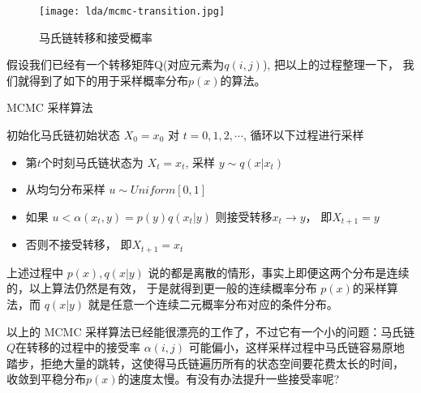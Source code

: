\begin{figure}[htbp]
\centering
\texttt{[image: lda/mcmc-transition.jpg]}
\caption{马氏链转移和接受概率}
\end{figure}

假设我们已经有一个转移矩阵Q(对应元素为$q(i,j)$), 把以上的过程整理一下，
我们就得到了如下的用于采样概率分布$p(x)$的算法。
\begin{algorithm}[h]
\caption{MCMC 采样算法}
\begin{algorithmic}[1]
\STATE 初始化马氏链初始状态 $X_0 = x_0$
\STATE 对 $t=0,1,2,\cdots$, 循环以下过程进行采样
\begin{itemize}
\item 第$t$个时刻马氏链状态为 $X_t=x_t$, 采样 $y \sim q(x|x_t)$
\item 从均匀分布采样 $u \sim Uniform[0,1]$
\item 如果 $u < \alpha(x_t,y) = p(y)q(x_t|y)$ 则接受转移$x_t\rightarrow y$， 即$X_{t+1} = y$
\item 否则不接受转移， 即$X_{t+1} = x_t$
\end{itemize}
\end{algorithmic}
\end{algorithm}

上述过程中 $p(x),q(x|y)$ 说的都是离散的情形，事实上即便这两个分布是连续的，以上算法仍然是有效，
于是就得到更一般的连续概率分布 $p(x)$的采样算法，而 $q(x|y)$ 就是任意一个连续二元概率分布对应的条件分布。

以上的 MCMC 采样算法已经能很漂亮的工作了，不过它有一个小的问题：马氏链$Q$在转移的过程中的接受率 $\alpha(i,j)$
可能偏小，这样采样过程中马氏链容易原地踏步，拒绝大量的跳转，这使得马氏链遍历所有的状态空间要花费太长的时间，
收敛到平稳分布$p(x)$的速度太慢。有没有办法提升一些接受率呢?

